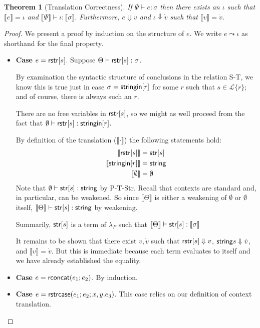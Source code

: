 \documentclass[11pt,leqno]{article}
\newtheorem{thm}{Theorem}
\theoremstyle{definition}
\newcommand{\Lagr}{\mathcal{L}}
\newcommand{\lang}[1]{\Lagr\{#1\}}
\newcommand{\lambdap}{\lambda_P}
\newcommand{\stringin}[1]{{\sf stringin}[#1]}
\renewcommand{\tstr}[1]{{{\sf str}[#1]}}
\newcommand{\str}{{\sf string}}
\newcommand{\sctx}{\Psi} %
\newcommand{\tctx}{\Theta} %
\newcommand{\strcase}[3]{ {\sf rstrcase}(#1; #2; #3)}
\newcommand{\trden}[1]{\llbracket #1 \rrbracket} %
\newcommand{\treduces}{ \Downarrow }
\newcommand{\sreduces}{ \Downarrow }
\begin{document}
\begin{thm}[Translation Correctness]\label{thm:trcorrect}
  If $\sctx \vdash e : \sigma$ then 
  there exists an $\iota$ such that $\trden{e} = \iota$
  and $\trden{\sctx} \vdash \iota : \trden{\sigma}$.
  Furthermore, $e \sreduces v$ and
  $\iota \treduces \dot{v}$ such that
  $\trden{v} = \dot{v}$.
\end{thm}
\begin{proof}
We present a proof by induction on the structure of $e$.
We write $e \leadsto \iota$ as shorthand for the final property.

\begin{itemize}[label=$ $, itemsep=1ex]
\item \textbf{Case $e = {\sf rstr}[s]$}. Suppose $\tctx \vdash \rstr{s} : \sigma$.

By examination the syntactic structure of conclusions in the relation S-T, 
we know this is true just in case $\sigma = \stringin{r}$ for some $r$ such that
$s \in \lang{r}$; and of course, there is always such an $r$.

There are no free variables in ${\sf rstr}[s]$, so we might as well proceed from the
fact that $\emptyset \vdash \rstr{s} : \stringin{r}$.

By definition of the translation ($\trden{\cdot}$) the following statements hold:
\begin{align}
\trden{\rstr{s}} &= \tstr{s} \\
\trden{\stringin{r}} &= \str \\
\trden{\emptyset} &= \emptyset
\end{align}
Note that $\emptyset \vdash \tstr{s} : \str$ by P-T-Str.
Recall that contexts are standard and, in particular, can be weakened.
So since $\trden{\tctx}$ is either a weakening of $\emptyset$ or $\emptyset$ itself,
$\trden{\tctx} \vdash \tstr{s} : \str$ by weakening.

Summarily, $\tstr{s}$ is a term of $\lambdap$ such that $\trden{\tctx} \vdash \tstr{s} : \trden{\sigma}$

It remains to be shown that there exist $v, \dot{v}$ such that $\rstr{s} \sreduces v$,
$\str{s} \treduces \dot{v}$, and $\trden{v} = \dot{v}$. But this is immediate because
each term evaluates to itself and we have already established the equality.

\item \textbf{Case $e = {\sf rconcat}(e_1;e_2)$}.  By induction.

\item \textbf{Case $e = \strcase{e_1}{e_2}{x,y.e_3}$}. This case relies on our definition
of context translation.


\end{itemize}
\end{proof}
\end{document}
